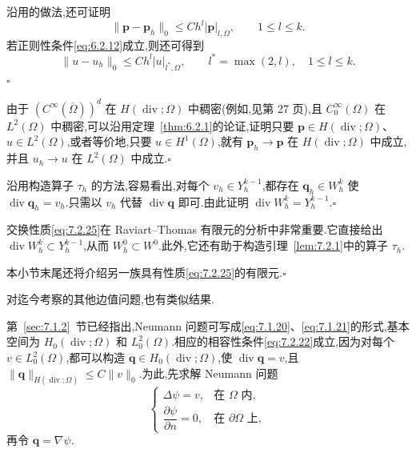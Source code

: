 \begin{note}
沿用的做法,还可证明
\[
  \|\boldsymbol{p}-\boldsymbol{p}_h\|_0\le Ch^l|\boldsymbol{p}|_{l,\Omega},\qquad 1\le l\le k.
\]
若正则性条件\eqref{eq:6.2.12}成立,则还可得到
\[
  \|u-u_h\|_0\le Ch^l|u|_{l^*,\Omega},\qquad l^*=\max(2,l),\quad 1\le l\le k.
\]
\hfill\(\square\)
\end{note}

\begin{note}
由于 \((C^\infty(\overline\Omega))^d\) 在 \(H(\operatorname{div};\Omega)\) 中稠密(例如,见第 27 页),且 \(C_0^\infty(\Omega)\) 在 \(L^2(\Omega)\) 中稠密,可以沿用定理~\ref{thm:6.2.1}的论证,证明只要 \(\boldsymbol{p}\in H(\operatorname{div};\Omega)\)、\(u\in L^2(\Omega)\),或者等价地,只要 \(u\in H^1(\Omega)\),就有 \(\boldsymbol{p}_h\to\boldsymbol{p}\) 在 \(H(\operatorname{div};\Omega)\) 中成立,并且 \(u_h\to u\) 在 \(L^2(\Omega)\) 中成立.\hfill\(\square\)
\end{note}

\begin{note}
沿用构造算子 \(\tau_h\) 的方法,容易看出,对每个 \(v_h\in Y_h^{k-1}\),都存在 \(\boldsymbol{q}_h\in W_h^k\) 使 \(\operatorname{div}\boldsymbol{q}_h=v_h\).只需以 \(v_h\) 代替 \(\operatorname{div}\boldsymbol{q}\) 即可.由此证明 \(\operatorname{div}W_h^k=Y_h^{k-1}\).\hfill\(\square\)
\end{note}

\begin{note}
交换性质\eqref{eq:7.2.25}在 Raviart--Thomas 有限元的分析中非常重要.它直接给出 \(\operatorname{div}W_h^k\subset Y_h^{k-1}\),从而 \(W_h^0\subset W^0\).此外,它还有助于构造引理~\ref{lem:7.2.1}中的算子 \(\tau_h\).

本小节末尾还将介绍另一族具有性质\eqref{eq:7.2.25}的有限元.\hfill\(\square\)
\end{note}

对迄今考察的其他边值问题,也有类似结果.

第~\ref{sec:7.1.2}~节已经指出,Neumann 问题可写成\eqref{eq:7.1.20}、\eqref{eq:7.1.21}的形式,基本空间为 \(H_0(\operatorname{div};\Omega)\) 和 \(L_0^2(\Omega)\).相应的相容性条件\eqref{eq:7.2.22}成立,因为对每个 \(v\in L_0^2(\Omega)\),都可以构造 \(\boldsymbol{q}\in H_0(\operatorname{div};\Omega)\),使 \(\operatorname{div}\boldsymbol{q}=v\),且 \(\|\boldsymbol{q}\|_{H(\operatorname{div};\Omega)}\le C\|v\|_0\).为此,先求解 Neumann 问题
\[
  \begin{cases}
    \Delta\psi=v,&\text{在 }\Omega\text{ 内},\\
    \dfrac{\partial\psi}{\partial n}=0,&\text{在 }\partial\Omega\text{ 上},
  \end{cases}
\]
再令 \(\boldsymbol{q}=\nabla\psi\).

